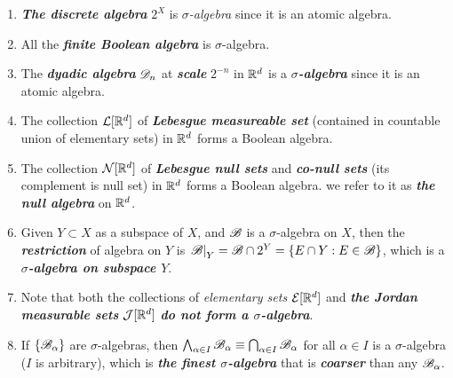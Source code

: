 \documentclass[11pt]{article}
\begin{document}
\begin{itemize}
\begin{example}
\begin{enumerate}
\item \emph{\textbf{The discrete algebra}} $2^{X}$ is \emph{$\sigma$-algebra} since it is an atomic algebra.

\item  All the \emph{\textbf{finite Boolean algebra}} is $\sigma$-algebra.

\item  The \emph{\textbf{dyadic algebra}} ${\mathscr D}_{n}$ at \textbf{\emph{scale}} $2^{-n}$ in ${\mathbb R}^d$ is a \emph{\textbf{$\sigma$-algebra}} since it is an atomic algebra.

\item The collection ${\mathcal L}[{\mathbb R}^{d}]$  of \emph{\textbf{Lebesgue measureable set}}  (contained in countable union of elementary sets) in ${\mathbb R}^{d}$ forms a Boolean algebra.

\item The collection ${\mathcal N}[{\mathbb R}^{d}]$ of \emph{\textbf{Lebesgue null sets}} and \emph{\textbf{co-null sets}} (its complement is null set) in ${\mathbb R}^{d}$ forms a Boolean algebra. we refer to it as \emph{\textbf{the null algebra}} on ${\mathbb R}^d$.

\item  Given $Y\subset X$ as a subspace of $X$, and ${\mathscr B}$ is a  $\sigma$-algebra on $X$, then the \emph{\textbf{restriction}} of algebra on $Y$ is 
$\left.{{\mathscr B}}\right\vert_{Y} = {\mathscr B} \cap 2^Y = \left\{E\cap Y: E\in {\mathscr B}\right\}$, which is a \emph{\textbf{$\sigma$-algebra on subspace $Y$}}.


\item Note that both the collections of \emph{elementary sets} ${\mathcal E}[{\mathbb R}^{d}]$ and \emph{\textbf{the Jordan measurable sets}} $\mathcal{J}[{\mathbb R}^{d}]$ \emph{\textbf{do not form a $\sigma$-algebra}}.


\item If $\{{\mathscr B}_{\alpha}\}$ are $\sigma$-algebras, then $\bigwedge_{\alpha\in I}{\mathscr B}_{\alpha}\equiv \bigcap_{\alpha\in I}{\mathscr B}_{\alpha}$ for all $\alpha\in I$ is a  $\sigma$-algebra ($I$ is arbitrary), which is \emph{\textbf{the finest $\sigma$-algebra}} that is \emph{\textbf{coarser}} than any ${\mathscr B}_{\alpha}$.  
\end{enumerate}
\end{example}



\end{itemize}
\end{document}
